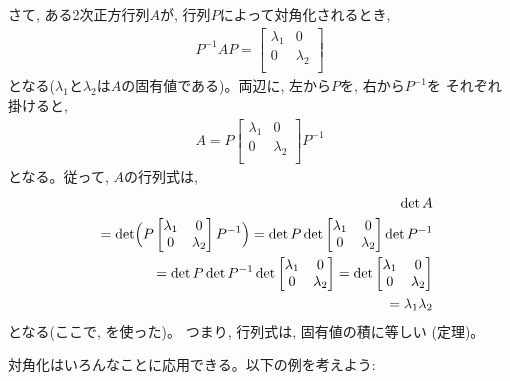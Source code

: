 さて, ある2次正方行列$A$が, 行列$P$によって対角化されるとき, 
\begin{eqnarray}
P^{-1}AP
=\begin{bmatrix}
\lambda_1 & 0 \\
0 & \lambda_2 \\
\end{bmatrix}
\end{eqnarray}
となる($\lambda_1$と$\lambda_2$は$A$の固有値である)。両辺に, 左から$P$を, 右から$P^{-1}$を
それぞれ掛けると, 
\begin{eqnarray}
A
=P\begin{bmatrix}
\lambda_1 & 0 \\
0 & \lambda_2 \\
\end{bmatrix}P^{-1}
\end{eqnarray}
となる。従って, $A$の行列式は, 
\begin{eqnarray}
&&\det A\nonumber\\
&&=\det\Bigl(P\begin{bmatrix}
\lambda_1 & 0 \\
0 & \lambda_2 \\
\end{bmatrix}P^{-1}\Bigr)
=\det P\det\begin{bmatrix}
\lambda_1 & 0 \\
0 & \lambda_2 \\
\end{bmatrix}\det P^{-1}\nonumber\\
&&=\det P\det P^{-1}\det\begin{bmatrix}
\lambda_1 & 0 \\
0 & \lambda_2 \\
\end{bmatrix}=\det\begin{bmatrix}
\lambda_1 & 0 \\
0 & \lambda_2 \\
\end{bmatrix}\nonumber\\
&&=\lambda_1\lambda_2
\end{eqnarray}
となる(ここで, を使った)。
つまり, 行列式は, 固有値の積に等しい (定理)。
\mv

対角化はいろんなことに応用できる。以下の例を考えよう:

